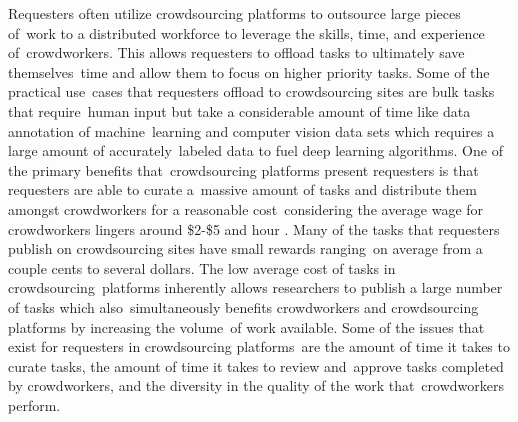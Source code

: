 \documentclass[letterpaper,12pt]{article}
\begin{document}
Requesters often utilize crowdsourcing platforms to outsource large pieces of\ 
work to a distributed workforce to leverage the skills, time, and experience of\ 
crowdworkers. This allows requesters to offload tasks to ultimately save themselves\ 
time and allow them to focus on higher priority tasks. Some of the practical use\ 
cases that requesters offload to crowdsourcing sites are bulk tasks that require\ 
human input but take a considerable amount of time like data annotation of machine\ 
learning and computer vision data sets which requires a large amount of accurately\ 
labeled data to fuel deep learning algorithms. One of the primary benefits that\
crowdsourcing platforms present requesters is that requesters are able to curate a\ 
massive amount of tasks and distribute them amongst crowdworkers for a reasonable cost\ 
considering the average wage for crowdworkers lingers around \$2-\$5 and hour \cite{Kaplan2018,hara2018data}.
Many of the tasks that requesters publish on crowdsourcing sites have small rewards ranging\
on average from a couple cents to several dollars. The low average cost of tasks in crowdsourcing\
platforms inherently allows researchers to publish a large number of tasks which also\
simultaneously benefits crowdworkers and crowdsourcing platforms by increasing the volume\
of work available. Some of the issues that exist for requesters in crowdsourcing platforms\
are the amount of time it takes to curate tasks, the amount of time it takes to review and\
approve tasks completed by crowdworkers, and the diversity in the quality of the work that\
crowdworkers perform.
\end{document}

